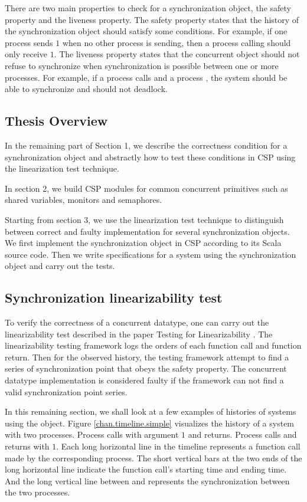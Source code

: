 \documentclass{article}
\begin{document}
There are two main properties to check for a synchronization object, the safety property and the liveness property. The safety property states that the history of the synchronization object should satisfy some conditions. For example, if one process sends $1$ when no other process is sending, then a process calling  should only receive $1$. The liveness property states that the concurrent object should not refuse to synchronize when synchronization is possible between one or more processes. For example, if a process calls  and a process , the system should be able to synchronize and should not deadlock. 

\subsection{Thesis Overview}
In the remaining part of Section 1, we describe the correctness condition for a synchronization object and abstractly how to test these conditions in CSP using the linearization test technique. 

In section 2, we build CSP modules for common concurrent primitives such as shared variables, monitors and semaphores.

Starting from section 3, we use the linearization test technique to distinguish between correct and faulty implementation for several synchronization objects. We first implement the synchronization object in CSP according to its Scala source code. Then we write specifications for a system using the synchronization object and carry out the tests.

\subsection{Synchronization linearizability test}
To verify the correctness of a concurrent datatype, one can carry out the linearizability test described in the paper Testing for Linearizability \cite{linearizability-testing}. The linearizability testing framework logs the orders of each function call and function return. Then for the observed history, the testing framework attempt to find a series of synchronization point that obeys the safety property. The concurrent datatype implementation is considered faulty if the framework can not find a valid synchronization point series. 

In this remaining section, we shall look at a few examples of histories of systems using the  object. Figure \ref{chan.timeline.simple} visualizes the history of a system with two processes. Process  calls  with argument $1$ and returns. Process  calls  and returns with $1$. Each long horizontal line in the timeline represents a function call made by the corresponding process. The short vertical bars at the two ends of the long horizontal line indicate the function call's starting time and ending time. And the long vertical line between  and  represents the synchronization between the two processes. 
\end{document}
